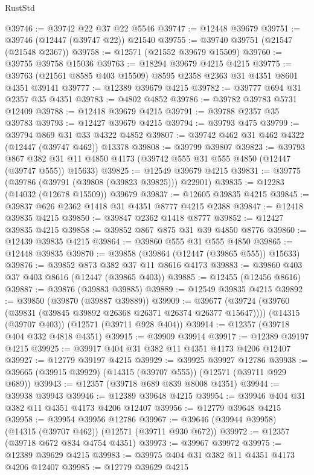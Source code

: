 \begin{lexlean}{RustStd}
\begin{coremodule}
@39746 := @39742 @22 @37 @22 @5546
@39747 := @12448 @39679
@39751 := @39746 (@12447 (@39747 @22)) @21540
@39755 := @39740 @39751 (@21547 (@21548 @2367))
@39758 := @12571 (@21552 @39679 @15509)
@39760 := @39755 @39758 @15036
@39763 := @18294 @39679 @4215 @4215
@39775 := @39763 (@21561 @8585 @403 @15509) @8595 @2358 @2363 @31 @4351 @8601 @4351 @39141
@39777 := @12389 @39679 @4215
@39782 := @39777 @694 @31 @2357 @35 @4351
@39783 := @4802 @4852
@39786 := @39782 @39783 @5731 @12409
@39788 := @12418 @39679 @4215
@39791 := @39788 @2357 @35 @39783
@39793 := @12427 @39679 @4215
@39794 := @39793 @475
@39799 := @39794 @869 @31 @33 @4322 @4852
@39807 := @39742 @462 @31 @462 @4322 (@12447 (@39747 @462)) @13378
@39808 := @39799 @39807
@39823 := @39793
    @867
    @382
    @31
    @11
    @4850
    @4173
    (@39742 @555 @31 @555 @4850 (@12447 (@39747 @555)) @15633)
@39825 := @12549 @39679 @4215
@39831 := @39775 (@39786 (@39791 (@39808 (@39823 @39825))) @22901)
@39835 := @12283 (@14032 (@12678 @15509)) @39679
@39837 := @12605 @39835 @4215
@39845 := @39837 @626 @2362 @1418 @31 @4351 @8777 @4215 @2388
@39847 := @12418 @39835 @4215
@39850 := @39847 @2362 @1418 @8777
@39852 := @12427 @39835 @4215
@39858 := @39852 @867 @875 @31 @39 @4850 @8776
@39860 := @12439 @39835 @4215
@39864 := @39860 @555 @31 @555 @4850
@39865 := @12448 @39835
@39870 := @39858 (@39864 (@12447 (@39865 @555)) @15633)
@39876 := @39852 @873 @382 @37 @11 @8616 @4173
@39883 := @39860 @403 @37 @403 @8616 (@12447 (@39865 @403))
@39885 := @12455 (@12456 @8616)
@39887 := @39876 (@39883 @39885)
@39889 := @12549 @39835 @4215
@39892 := @39850 (@39870 (@39887 @39889))
@39909 := @39677
    (@39724 (@39760 (@39831 (@39845 @39892 @26368 @26371 @26374 @26377 @15647))))
    (@14315 (@39707 @403))
    (@12571 (@39711 @928 @404))
@39914 := @12357 (@39718 @404 @332 @4818 @4351)
@39915 := @39909 @39914
@39917 := @12389 @39197 @4215
@39925 := @39917 @404 @31 @382 @11 @4351 @4173 @4206 @12407
@39927 := @12779 @39197 @4215
@39929 := @39925 @39927 @12786
@39938 := @39665 (@39915 @39929) (@14315 (@39707 @555)) (@12571 (@39711 @929 @689))
@39943 := @12357 (@39718 @689 @839 @8008 @4351)
@39944 := @39938 @39943
@39946 := @12389 @39648 @4215
@39954 := @39946 @404 @31 @382 @11 @4351 @4173 @4206 @12407
@39956 := @12779 @39648 @4215
@39958 := @39954 @39956 @12786
@39967 := @39646 (@39944 @39958) (@14315 (@39707 @462)) (@12571 (@39711 @930 @672))
@39972 := @12357 (@39718 @672 @834 @4754 @4351)
@39973 := @39967 @39972
@39975 := @12389 @39629 @4215
@39983 := @39975 @404 @31 @382 @11 @4351 @4173 @4206 @12407
@39985 := @12779 @39629 @4215

\end{coremodule}
\end{lexlean}
